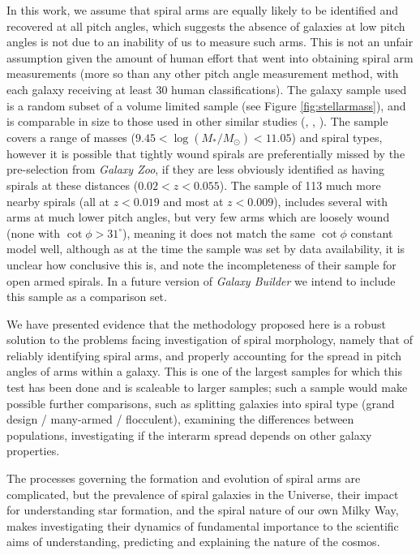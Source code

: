 In this work, we assume that spiral arms are equally likely to be identified and recovered at all pitch angles, which suggests the absence of galaxies at low pitch angles is not due to an inability of us to measure such arms. This is not an unfair assumption given the amount of human effort that went into obtaining spiral arm measurements (more so than any other pitch angle measurement method, with each galaxy receiving at least 30 human classifications). The galaxy sample used is a random subset of a volume limited sample (see Figure \ref{fig:stellarmass}), and is comparable in size to those used in other similar studies (\citealt{2013MNRAS.436.1074S}, \citealt{2019ApJ...871..194Y}, \citealt{2019arXiv190910291P}). The sample covers a range of masses ($9.45 < \log(M_* / M_\odot) < 11.05$) and spiral types, however it is possible that tightly wound spirals are preferentially missed by the pre-selection from \textit{Galaxy Zoo}, if they are less obviously identified as having spirals at these distances ($0.02<z<0.055$). The \citet{1981AJ.....86.1847K} sample of 113 much more nearby spirals (all at $z<0.019$ and most at $z<0.009$), includes several with arms at much lower pitch angles, but very few arms which are loosely wound (none with $\cot \phi > 31^\circ$), meaning it does not match the same $\cot \phi$ constant model well, although as at the time the sample was set by data availability, it is unclear how conclusive this is, and \citet{1981AJ.....86.1847K} note the incompleteness of their sample for open armed spirals. In a future version of {\it Galaxy Builder} we intend to include this sample as a comparison set.

We have presented evidence that the methodology proposed here is a robust solution to the problems facing investigation of spiral morphology, namely that of reliably identifying spiral arms, and properly accounting for the spread in pitch angles of arms within a galaxy. This is one of the largest samples for which this test has been done and is scaleable to larger samples; such a sample would make possible further comparisons, such as splitting galaxies into spiral type (grand design / many-armed / flocculent), examining the differences between populations, investigating if the interarm spread depends on other galaxy properties.

The processes governing the formation and evolution of spiral arms are complicated, but the prevalence of spiral galaxies in the Universe, their impact for understanding star formation, and the spiral nature of our own Milky Way, makes investigating their dynamics of fundamental importance to the scientific aims of understanding, predicting and explaining the nature of the cosmos.
